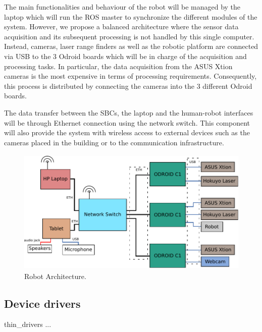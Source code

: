 The main functionalities and behaviour of the robot will be managed by
the laptop which will run the ROS master to synchronize the different
modules of the system.  However, we propose a balanced architecture
where the sensor data acquisition and its subsequent processing is not
handled by this single computer.  Instead, cameras, laser range
finders as well as the robotic platform are connected via USB to the 3
Odroid boards which will be in charge of the acquisition and
processing tasks. In particular, the data acquisition from the ASUS
Xtion cameras is the most expensive in terms of processing
requirements. Consequently, this process is distributed by connecting
the cameras into the 3 different Odroid boards.

The data transfer between the SBCs, the laptop and the human-robot
interfaces will be through Ethernet connection using the network
switch. This component will also provide the system with wireless access to external
devices such as the cameras placed in the building or to the communication infrastructure.

\begin{figure}[h!]
\begin{center}
\includegraphics[height=6cm]{fig/robotarchitecture.pdf}
\end{center}
\caption{Robot Architecture.}
\label{fig:architecture}
\end{figure}


\subsection{Device drivers}

thin\_drivers ...






